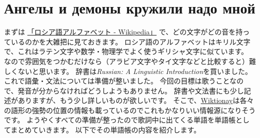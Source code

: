 \documentclass[12pt]{ltjsarticle}
\begin{document}
\section{Ангелы и демоны кружили надо мной}
まずは
\href{http://ja.wikipedia.org/wiki/%E3%83%AD%E3%82%B7%E3%82%A2%E8%AA%9E%E3%82%A2%E3%83%AB%E3%83%95%E3%82%A1%E3%83%99%E3%83%83%E3%83%88}{「ロシア語アルファベット - Wikipedia」}
で、どの文字がどの音を持っているのかを大雑把に見ておきます。
ロシア語のアルファベットはキリル文字で、これはラテン文字や数学・物理学でよく使うギリシャ文字に似ています。
なので雰囲気をつかむだけなら（アラビア文字やタイ文字などと比較すると）難しくないと思います。
辞書は\textit{Russian: A Linguistic Introduction}を買いました。これで語彙・文法については準備が整いました。
今回の目標は歌うことなので、発音が分からなければどうしようもありません。
辞書や文法書にも少し記述がありますが、もう少し詳しいものが欲しいです。
そこで、\href{https://ru.wiktionary.org/wiki}{Wiktionay}は各々の語形の強勢の位置の情報も載っているのでこれもかなりいい情報源になりそうです。
ようやくすべての準備が整ったので歌詞中に出てくる単語を単語帳としてまとめていきます。
以下でその単語帳の内容を紹介します。
\end{document}
